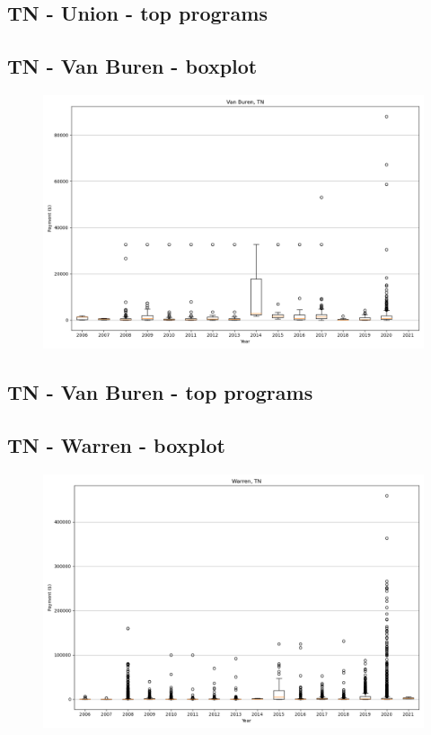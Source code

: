 \subsection*{TN - Union - top programs}

\newpage
\subsection*{TN - Van Buren - boxplot}
\begin{figure}[h]
\centering
\includegraphics[width=7in]{../output/boxplots/counties/Van Buren-TN_boxplot.png}
\end{figure}


\subsection*{TN - Van Buren - top programs}

\newpage
\subsection*{TN - Warren - boxplot}
\begin{figure}[h]
\centering
\includegraphics[width=7in]{../output/boxplots/counties/Warren-TN_boxplot.png}
\end{figure}


